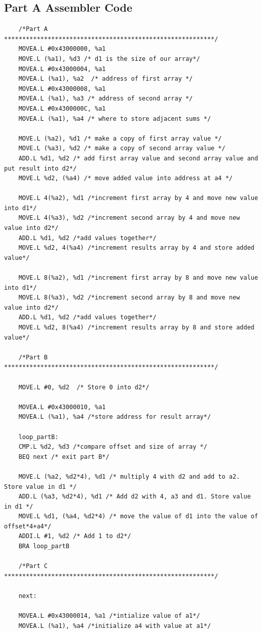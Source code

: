 \documentclass[10pt, letterpaper, titlepage]{article} %
\begin{document}
\subsection{Part A Assembler Code}
\begin{lstlisting}
	/*Part A **********************************************************/
	MOVEA.L #0x43000000, %a1 
	MOVE.L (%a1), %d3 /* d1 is the size of our array*/
	MOVEA.L #0x43000004, %a1
	MOVEA.L (%a1), %a2  /* address of first array */
	MOVEA.L #0x43000008, %a1
	MOVEA.L (%a1), %a3 /* address of second array */
	MOVEA.L #0x4300000C, %a1 
	MOVEA.L (%a1), %a4 /* where to store adjacent sums */
	
	MOVE.L (%a2), %d1 /* make a copy of first array value */
	MOVE.L (%a3), %d2 /* make a copy of second array value */
	ADD.L %d1, %d2 /* add first array value and second array value and put result into d2*/
	MOVE.L %d2, (%a4) /* move added value into address at a4 */
	
	MOVE.L 4(%a2), %d1 /*increment first array by 4 and move new value into d1*/
	MOVE.L 4(%a3), %d2 /*increment second array by 4 and move new value into d2*/
	ADD.L %d1, %d2 /*add values together*/
	MOVE.L %d2, 4(%a4) /*increment results array by 4 and store added value*/
	
	MOVE.L 8(%a2), %d1 /*increment first array by 8 and move new value into d1*/
	MOVE.L 8(%a3), %d2 /*increment second array by 8 and move new value into d2*/
	ADD.L %d1, %d2 /*add values together*/
	MOVE.L %d2, 8(%a4) /*increment results array by 8 and store added value*/
	
	/*Part B **********************************************************/
	
	MOVE.L #0, %d2  /* Store 0 into d2*/
	
	MOVEA.L #0x43000010, %a1 
	MOVEA.L (%a1), %a4 /*store address for result array*/
	
	loop_partB:
	CMP.L %d2, %d3 /*compare offset and size of array */
	BEQ next /* exit part B*/
	
	MOVE.L (%a2, %d2*4), %d1 /* multiply 4 with d2 and add to a2. Store value in d1 */
	ADD.L (%a3, %d2*4), %d1 /* Add d2 with 4, a3 and d1. Store value in d1 */
	MOVE.L %d1, (%a4, %d2*4) /* move the value of d1 into the value of offset*4+a4*/
	ADDI.L #1, %d2 /* Add 1 to d2*/
	BRA loop_partB 
	
	/*Part C **********************************************************/
	
	next:
	
	MOVEA.L #0x43000014, %a1 /*intialize value of a1*/
	MOVEA.L (%a1), %a4 /*initialize a4 with value at a1*/
	

\end{lstlisting}
\end{document}

